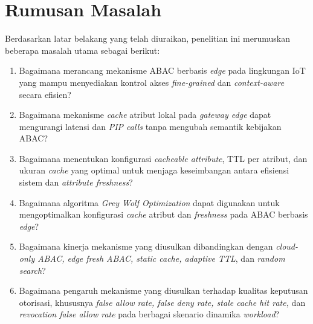 \section{Rumusan Masalah}

Berdasarkan latar belakang yang telah diuraikan, penelitian ini merumuskan beberapa masalah utama sebagai berikut:

\begin{enumerate}
    \item Bagaimana merancang mekanisme ABAC berbasis \textit{edge} pada lingkungan IoT yang mampu menyediakan kontrol akses \textit{fine-grained} dan \textit{context-aware} secara efisien?
    \item Bagaimana mekanisme \textit{cache} atribut lokal pada \textit{gateway edge} dapat mengurangi latensi dan \textit{PIP calls} tanpa mengubah semantik kebijakan ABAC?
    \item Bagaimana menentukan konfigurasi \textit{cacheable attribute}, TTL per atribut, dan ukuran \textit{cache} yang optimal untuk menjaga keseimbangan antara efisiensi sistem dan \textit{attribute freshness}?
    \item Bagaimana algoritma \textit{Grey Wolf Optimization} dapat digunakan untuk mengoptimalkan konfigurasi \textit{cache} atribut dan \textit{freshness} pada ABAC berbasis \textit{edge}?
    \item Bagaimana kinerja mekanisme yang diusulkan dibandingkan dengan \textit{cloud-only ABAC, edge fresh ABAC, static cache, adaptive TTL}, dan \textit{random search}?
    \item Bagaimana pengaruh mekanisme yang diusulkan terhadap kualitas keputusan otorisasi, khususnya \textit{false allow rate, false deny rate, stale cache hit rate,} dan \textit{revocation false allow rate} pada berbagai skenario dinamika \textit{workload}? 
\end{enumerate}
